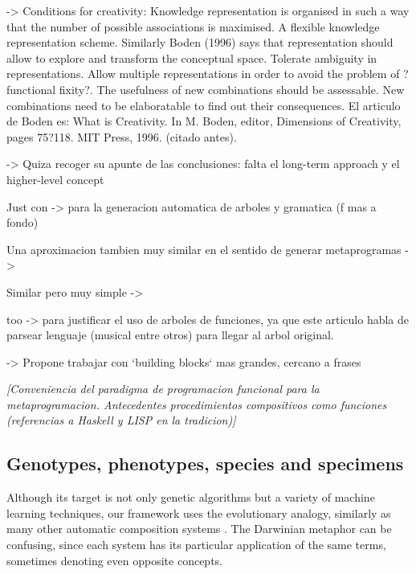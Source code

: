 \documentclass{article}
\begin{document}
{\color{red}


\cite{DBLP:journals/air/RoweP93} -> Conditions for creativity:
Knowledge representation is organised in such a
way that the number of possible associations is
maximised. A flexible knowledge representation
scheme. Similarly Boden (1996) says that representation
should allow to explore and transform the
conceptual space.
Tolerate ambiguity in representations.
Allow multiple representations in order to avoid the
problem of ?functional fixity?.
The usefulness of new combinations should be assessable.
New combinations need to be elaboratable to find
out their consequences.
El articulo de Boden es: 
What is Creativity. In M. Boden, editor, Dimensions of Creativity, pages 75?118. MIT Press, 1996. (citado antes).

\cite{Herremans:2017:FTM:3145473.3108242} -> Quiza recoger su apunte de las conclusiones: falta el long-term approach y el higher-level concept 




Just con \cite{Drewes_analgebra} -> para la generacion automatica de arboles y gramatica (f mas a fondo)

Una aproximacion tambien muy similar en el sentido de generar metaprogramas -> \cite{Spector_inductionand}

Similar pero muy simple -> \cite{Ando}

too \cite{Bod_thedata-oriented} -> para justificar el uso de arboles de funciones, ya que este articulo habla de parsear lenguaje (musical entre otros) para llegar al arbol original.

}



 
{\color{red}

\cite{DBLP:conf/icmc/Jacob95} -> Propone trabajar con `building blocks` mas grandes, cercano a frases
}


{\color{gray} \textsl{[Conveniencia del paradigma de programacion funcional para la metaprogramacion. Antecedentes procedimientos compositivos como funciones (referencias a Haskell y LISP en la tradicion)]}}





\subsection{Genotypes, phenotypes, species and specimens}

Although its target is not only genetic algorithms but a variety of machine learning techniques, our framework uses the evolutionary analogy, similarly as many other automatic composition systems \cite{Sulyok2019, SnchezQuintana2013, add more...}. The Darwinian metaphor can be confusing, since each system has its particular application of the same terms, sometimes denoting even opposite concepts. 
\end{document}
